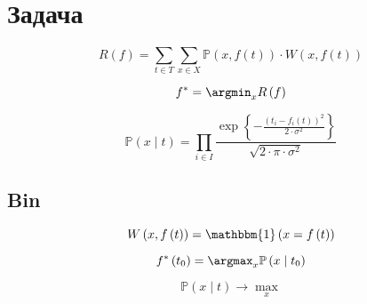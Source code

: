 \section{Задача}

\begin{equation*}
  R \left( f \right)
  = \sum\limits_{t \in T} \sum\limits_{x \in X}
    \mathbb{P} \left( x,  f\left( t \right) \right)
    \cdot W \left( x, f\left( t \right) \right)
\end{equation*}

\begin{equation*}
  f^* = \argmin_x R \left( f \right)
\end{equation*}

\begin{equation*}
  \mathbb{P}\left( x \mid t \right)
  = \prod_{i \in I}
    \frac{\exp{\left\{- \frac{\left( t_i - f_i\left( t \right) \right)^2}
         {2 \cdot \sigma^2} \right\}}}{\sqrt{2 \cdot \pi \cdot \sigma^2}}
\end{equation*}

\subsection{Bin}

\begin{equation*}
  W \left( x, f\left( t \right) \right)
  = \mathbbm{1} \left( x = f\left( t \right) \right)
\end{equation*}

\begin{equation*}
  f^* \left( t_0 \right)
  = \argmax_x \mathbb{P} \left( x \mid  t_0 \right)
\end{equation*}

\begin{equation*}
  \mathbb{P}\left( x \mid t \right) \to \max_x
\end{equation*}
